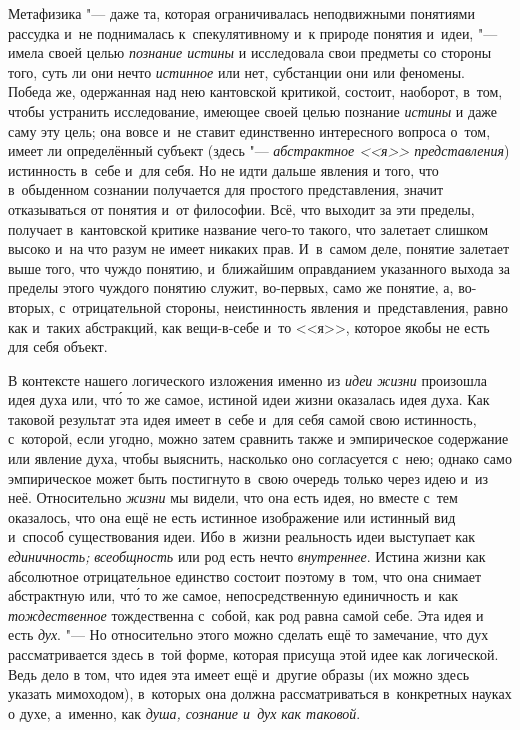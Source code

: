 Метафизика "--- даже та, которая ограничивалась
неподвижными понятиями рассудка и~не поднималась к~спекулятивному и~к
природе понятия и~идеи, "--- имела своей целью {\em познание истины} и
исследовала свои предметы со стороны того, суть ли они нечто
{\em истинное} или нет,
субстанции они или феномены. Победа же, одержанная над нею кантовской
критикой, состоит, наоборот, в~том, чтобы устранить исследование, имеющее
своей целью познание {\em истины}
и даже саму эту цель; она вовсе и~не ставит единственно
интересного вопроса о~том, имеет ли определённый субъект (здесь
"--- {\em абстрактное <<я>> представления})
истинность в~себе и~для себя. Но не идти дальше явления и
того, что в~обыденном сознании получается для простого представления,
значит отказываться от понятия и~от философии. Всё, что выходит за эти
пределы, получает в~кантовской критике название чего-то такого, что
залетает слишком высоко и~на что разум не имеет никаких прав. И~в~самом
деле, понятие залетает выше того, что чуждо понятию, и~ближайшим
оправданием указанного выхода за пределы этого чуждого понятию служит,
во-первых, само же понятие, а, во-вторых, с~отрицательной
стороны, неистинность явления и~представления, равно как и~таких
абстракций, как вещи-в-себе и~то <<я>>, которое якобы не есть для себя
объект.

В контексте нашего логического изложения именно из {\em идеи жизни}
произошла идея духа или, чт\'{о} то же самое, истиной идеи жизни
оказалась идея духа. Как таковой результат эта идея имеет в~себе и~для себя
самой свою истинность, с~которой, если угодно, можно затем сравнить также и
эмпирическое содержание или явление духа, чтобы выяснить, насколько оно
согласуется с~нею; однако само эмпирическое может быть постигнуто в~свою
очередь только через идею и~из неё. Относительно {\em жизни} мы видели,
что она есть идея, но вместе с~тем оказалось, что она ещё не есть истинное
изображение или истинный вид и~способ существования идеи. Ибо в~жизни
реальность идеи выступает как {\em единичность;} {\em всеобщность} или род
есть нечто {\em внутреннее}.
Истина жизни как абсолютное отрицательное единство состоит
поэтому в~том, что она снимает абстрактную или, чт\'{о} то же самое,
непосредственную единичность и~как {\em тождественное}
тождественна с~собой, как род равна самой себе. Эта идея и
есть {\em дух}. "--- Но
относительно этого можно сделать ещё то замечание, что дух рассматривается
здесь в~той форме, которая присуща этой идее как логической. Ведь дело в
том, что идея эта имеет ещё и~другие образы (их можно здесь указать
мимоходом), в~которых она должна рассматриваться в~конкретных науках о
духе, а~именно, как {\em душа, сознание и~дух как таковой}.

